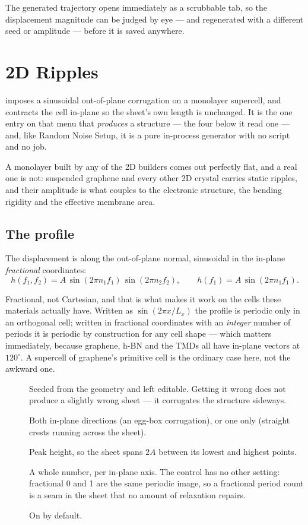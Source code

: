 The generated trajectory opens immediately as a scrubbable tab, so the
displacement magnitude can be judged by eye --- and regenerated with a
different seed or amplitude --- before it is saved anywhere.

\section{2D Ripples}
\label{sec:ripples}

\menusep{}\menusep{} imposes a
sinusoidal out-of-plane corrugation on a monolayer supercell, and contracts
the cell in-plane so the sheet's own length is unchanged. It is the one entry
on that menu that \emph{produces} a structure --- the four below it read one
--- and, like Random Noise Setup, it is a pure in-process generator with no
script and no job.

A monolayer built by any of the 2D builders comes out perfectly flat, and a
real one is not: suspended graphene and every other 2D crystal carries static
ripples, and their amplitude is what couples to the electronic structure, the
bending rigidity and the effective membrane area.

\subsection{The profile}

The displacement is along the out-of-plane normal, sinusoidal in the in-plane
\emph{fractional} coordinates:
\[
  h(f_1, f_2) = A\,\sin(2\pi n_1 f_1)\,\sin(2\pi n_2 f_2),
  \qquad
  h(f_1) = A\,\sin(2\pi n_1 f_1).
\]

Fractional, not Cartesian, and that is what makes it work on the cells these
materials actually have. Written as $\sin(2\pi x/L_x)$ the profile is
periodic only in an orthogonal cell; written in fractional coordinates with
an \emph{integer} number of periods it is periodic by construction for any
cell shape --- which matters immediately, because graphene, h-BN and the TMDs
all have in-plane vectors at $120^\circ$. A supercell of graphene's primitive
cell is the ordinary case here, not the awkward one.

\begin{description}
  \item[] Seeded from the geometry and left editable.
    Getting it wrong does not produce a slightly wrong sheet --- it
    corrugates the structure sideways.
  \item[] Both in-plane directions (an egg-box corrugation),
    or one only (straight crests running across the sheet).
  \item[] Peak height, so the sheet spans $2A$ between its
    lowest and highest points.
  \item[] A whole number, per in-plane axis. The
    control has no other setting: fractional 0 and 1 are the same periodic
    image, so a fractional period count is a seam in the sheet that no
    amount of relaxation repairs.
  \item[] On by default.
\end{description}

